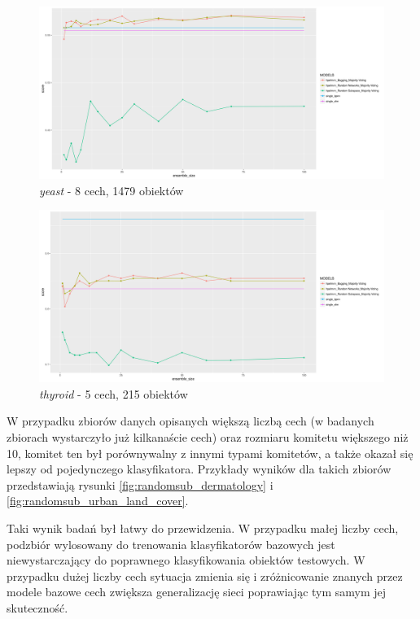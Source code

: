 \documentclass[11pt, a4paper, titlepage]{report}
\begin{document}
\begin{figure}[H]
	\includegraphics[width=1.0\textwidth]{type4_primary_task_dataset_yeast}
    \centering
    \caption{\textit{yeast} - 8 cech, 1479 obiektów}
    \label{fig:randomsub_yeast}
\end{figure}

\begin{figure}[H]
	\includegraphics[width=1.0\textwidth]{type4_primary_task_dataset_thyroid}
    \centering
    \caption{\textit{thyroid} - 5 cech, 215 obiektów}
    \label{fig:randomsub_thyroid}
\end{figure}

W przypadku zbiorów danych opisanych większą liczbą cech (w badanych zbiorach wystarczyło już kilkanaście cech) oraz rozmiaru komitetu większego niż 10, komitet ten był porównywalny z innymi typami komitetów, a także okazał się lepszy od pojedynczego klasyfikatora. Przykłady wyników dla takich zbiorów przedstawiają rysunki \ref{fig:randomsub_dermatology} i \ref{fig:randomsub_urban_land_cover}.

Taki wynik badań był łatwy do przewidzenia. W przypadku małej liczby cech, podzbiór wylosowany do trenowania klasyfikatorów bazowych jest niewystarczający do poprawnego klasyfikowania obiektów testowych. W przypadku dużej liczby cech sytuacja zmienia się i zróżnicowanie znanych przez modele bazowe cech zwiększa generalizację sieci poprawiając tym samym jej skuteczność.
\end{document}
